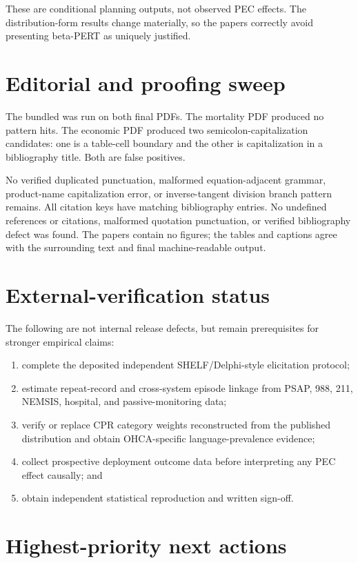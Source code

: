\documentclass[10pt]{article}
\begin{document}
These are conditional planning outputs, not observed PEC effects.  The
distribution-form results change materially, so the papers correctly avoid
presenting beta-PERT as uniquely justified.

\section*{Editorial and proofing sweep}

The bundled  was run on both final PDFs.  The
mortality PDF produced no pattern hits.  The economic PDF produced two
semicolon-capitalization candidates: one is a table-cell boundary and the other
is capitalization in a bibliography title.  Both are false positives.

No verified duplicated punctuation, malformed equation-adjacent grammar,
product-name capitalization error, or inverse-tangent division branch pattern
remains.
All citation keys have matching bibliography entries.  No undefined references
or citations, malformed quotation punctuation, or verified bibliography defect
was found.  The papers contain no figures; the tables and captions agree with
the surrounding text and final machine-readable output.

\section*{External-verification status}

The following are not internal release defects, but remain prerequisites for
stronger empirical claims:
\begin{enumerate}
\item complete the deposited independent SHELF/Delphi-style elicitation protocol;
\item estimate repeat-record and cross-system episode linkage from PSAP, 988,
211, NEMSIS, hospital, and passive-monitoring data;
\item verify or replace CPR category weights reconstructed from the published
distribution and obtain OHCA-specific language-prevalence evidence;
\item collect prospective deployment outcome data before interpreting any PEC
effect causally; and
\item obtain independent statistical reproduction and written sign-off.
\end{enumerate}

\section*{Highest-priority next actions}
\end{document}
